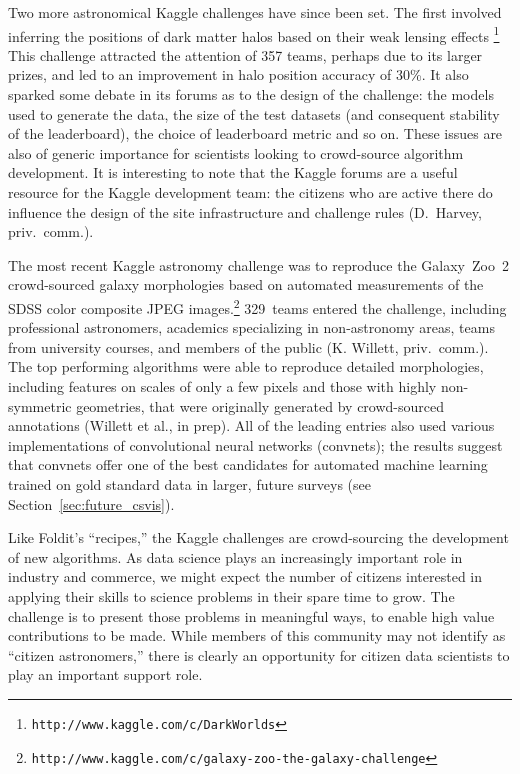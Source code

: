 \documentclass{ar2e}
\def\Sref#1{Section~\ref{#1}\xspace}
\def\url#1{\texttt{#1}}
\begin{document}
Two more astronomical Kaggle challenges have since been set. The first involved
inferring the positions of dark matter halos based on their weak lensing effects
\citep{Harvey++2014}\footnote{\url{http://www.kaggle.com/c/DarkWorlds}}  This
challenge attracted the attention of 357 teams, perhaps due to its larger
prizes, and led to an improvement in halo position accuracy of 30\%.  It also
sparked some debate in its forums as to the design of the challenge: the models
used to generate the data, the size of the test datasets (and consequent
stability of the leaderboard),  the choice of leaderboard metric and so on.
These issues are also of generic importance for scientists looking to
crowd-source algorithm development.   It is interesting to note that the Kaggle
forums are a useful resource for the Kaggle development team: the citizens who
are active there do influence the design of the site infrastructure and
challenge rules (D.~Harvey, priv.~comm.). 

The most recent Kaggle astronomy challenge was to reproduce the Galaxy~Zoo~2
crowd-sourced galaxy morphologies based on automated measurements of the SDSS
color composite JPEG
images.\footnote{\url{http://www.kaggle.com/c/galaxy-zoo-the-galaxy-challenge}}
329~teams entered the challenge, including professional astronomers, academics
specializing in non-astronomy areas, teams from university courses,  and members
of the public (K. Willett, priv.\ comm.).  The top performing algorithms were
able to reproduce detailed morphologies, including features on scales of only a
few pixels and those with highly non-symmetric geometries, that were originally
generated by crowd-sourced annotations (Willett et al., in prep). All of the
leading entries also used various implementations of convolutional neural
networks (convnets); the results suggest that convnets offer one of the best
candidates for automated machine learning trained on gold standard data in
larger, future surveys (see \Sref{sec:future_csvis}). 

Like Foldit's ``recipes,'' the Kaggle challenges are crowd-sourcing the
development of new algorithms. As data science plays an increasingly important
role in industry and commerce, we might expect the number of citizens interested
in applying their skills to science problems in their spare time to grow. The
challenge is to present those problems in meaningful ways, to enable high value
contributions to be made. While members of this community may not identify as
``citizen astronomers,'' there is clearly an opportunity for citizen data
scientists to play an important support role.
\end{document}

